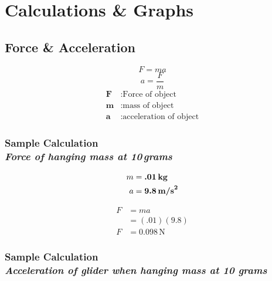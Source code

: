
\section{Calculations \& Graphs}

\vspace{-0.5cm}
\singlespacing


\subsection{Force \& Acceleration} 

{\centering
\begin{equation}
	F = ma 
	\label{eq:NetForce}
\end{equation}
\begin{equation}
	a = \frac{F}{m} 
	\label{eq:CalculatedAcc}
\end{equation}
\begin{align*}
	\boldsymbol{F} &: \text{Force of object} \\
	\boldsymbol{m} &: \text{mass of object} \\
	\boldsymbol{a} &: \text{acceleration of object}
\end{align*}}

\subsubsection{Sample Calculation \\ {\normalfont \small\textit{Force of hanging mass at 10\,grams}}}

{\centering
{}
\begin{align*}
	m &= \boldsymbol{.01\,\text{\textbf{kg}}} \\
	a &= \boldsymbol{9.8\,\text{\textbf{m/s}}^2}
\end{align*}

\begin{align*}
	F &= ma \\
	&= (.01)(9.8) \\
	F &= \boxed{0.098\,\text{N}}
\end{align*}}

\subsubsection{Sample Calculation \\ {\normalfont \small\textit{Acceleration of glider when hanging mass at 10 grams}}}


